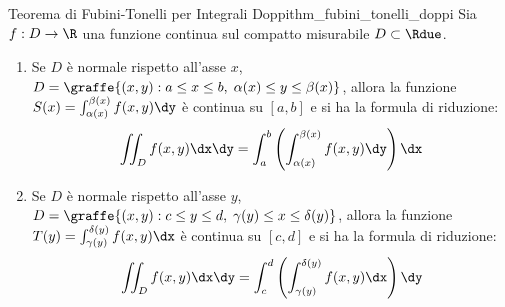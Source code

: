 \begin{teorema}{Teorema di Fubini-Tonelli per Integrali Doppi}{thm_fubini_tonelli_doppi}
Sia $f: D \to \R$ una funzione continua sul compatto misurabile $D \subset \Rdue$.
\begin{enumerate}
    \item Se $D$ è normale rispetto all'asse $x$, $D = \graffe{(x,y) : a \le x \le b, \; \alpha(x) \le y \le \beta(x)}$, allora la funzione $S(x) = \int_{\alpha(x)}^{\beta(x)} f(x,y) \dy$ è continua su $[a,b]$ e si ha la formula di riduzione:
    \[
    \iint_D f(x,y) \dx\dy = \int_{a}^{b} \left( \int_{\alpha(x)}^{\beta(x)} f(x,y) \dy \right) \dx
    \]
    \item Se $D$ è normale rispetto all'asse $y$, $D = \graffe{(x,y) : c \le y \le d, \; \gamma(y) \le x \le \delta(y)}$, allora la funzione $T(y) = \int_{\gamma(y)}^{\delta(y)} f(x,y) \dx$ è continua su $[c,d]$ e si ha la formula di riduzione:
    \[
    \iint_D f(x,y) \dx\dy = \int_{c}^{d} \left( \int_{\gamma(y)}^{\delta(y)} f(x,y) \dx \right) \dy
    \]
\end{enumerate}
\end{teorema}

